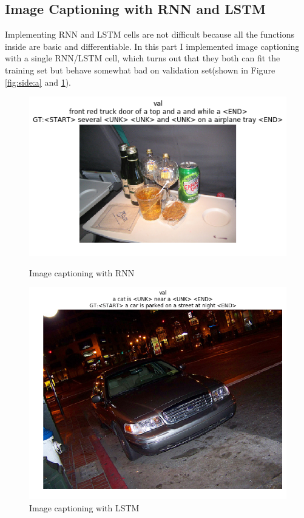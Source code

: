 \documentclass{article} %
\begin{document}
\subsection{Image Captioning with RNN and LSTM}
Implementing RNN and LSTM cells are not difficult because all the functions inside are basic and differentiable. In this part I implemented image captioning with a single RNN/LSTM cell, which turns out that they both can fit the training set but behave somewhat bad on validation set(shown in Figure \ref{fig:side:a} and \ref{fig:side:b}).
\begin{figure}
\begin{minipage}[t]{0.5\textwidth}
	\centering
	\includegraphics[width=\textwidth]{rnn-caption.png}
	\caption{Image captioning with RNN}
	\label{fig:side:a}
\end{minipage}%
\begin{minipage}[t]{0.5\textwidth}
	\centering
	\includegraphics[width=.8\textwidth]{lstm-caption.png}
	\caption{Image captioning with LSTM}
	\label{fig:side:b}
\end{minipage}
\end{figure}
\end{document}
